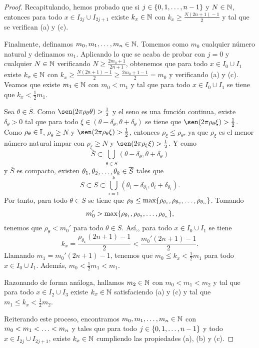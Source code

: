 \documentclass[a4paper, 12pt, oneside]{book}
\begin{document}
\begin{proof}
    Recapitulando, hemos probado que si $j \in \{0,1,\mathellipsis,n-1\}$ y $N \in \mathbb N$, entonces para todo $x \in I_{2j}\cup I_{2j+1}$ existe $k_x \in \mathbb N$ con $k_x \geq \frac{N(2n+1)-1}{2}$ y tal que se verifican (a) y (c).
    
    Finalmente, definamos $m_0,m_1,\mathellipsis,m_n\in \mathbb N$. Tomemos como $m_0$ cualquier número natural y definamos $m_1$. Aplicando lo que se acaba de probar con $j = 0$ y cualquier $N \in \mathbb N$ verificando $N \geq \frac{2m_0+1}{2n+1}$, obtenemos que para todo $x \in I_0 \cup I_1$ existe $k_x \in \mathbb N$ con $k_x \geq \frac{N(2n+1)-1}{2} \geq \frac{2m_0+1-1}{2}= m_0$ y verificando (a) y (c). Veamos que existe $m_1 \in \mathbb N$ con $m_0 < m_1$ y tal que para todo $x \in I_0\cup I_1$ se tiene que $k_x < \frac{1}{2} m_1$.

    Sea $\theta \in \overline{S}$. Como $\sen(2\pi\rho_\theta\theta) > \frac{1}{2}$ y el seno es una función continua, existe $\delta_\theta > 0$ tal que para todo ${\xi} \in (\theta-\delta_\theta,\theta+\delta_\theta)$ se tiene que $\sen(2\pi\rho_{\theta}{\xi}) > \frac{1}{2}$. Como $\rho_\theta \in \mathbb I$, $\rho_\theta \geq N$ y $\sen(2\pi\rho_\theta\xi)> \frac{1}{2}$, entonces $\rho_\xi \leq \rho_\theta$, ya que $\rho_\xi$ es el menor número natural impar con $\rho_\xi \geq N$ y $\sen(2\pi \rho_\xi\xi) > \frac{1}{2}$. Y como
    \[\overline{S} \subset \bigcup_{\theta \in \overline{S}}(\theta - \delta_\theta, \theta + \delta_\theta)\]
    y $\overline{S}$ es compacto, existen $\theta_1,\theta_2,\mathellipsis,\theta_k \in \overline{S}$ tales que
    \[S \subset \overline{S} \subset \bigcup_{i=1}^k (\theta_i-\delta_{\theta_i},\theta_i+\delta_{\theta_i}).\]
    Por tanto, para todo $\theta \in S$ se tiene que $\rho_\theta \leq \max\{\rho_{\theta_1},\rho_{\theta_2},\mathellipsis,\rho_{\theta_n}\}$. Tomando
    \[m_0' > \max \{\rho_{\theta_1},\rho_{\theta_2},\mathellipsis,\rho_{\theta_n}\},\]
    tenemos que $\rho_\theta < m_0'$ para todo $\theta \in S$. Así,, para todo $x \in I_0 \cup I_1$ se tiene
    \[k_x = \frac{\rho_{\theta_x}(2n+1)-1}{2} < \frac{m_0'(2n+1)-1}{2}.\]
    Llamando $m_1 = m_0'(2n+1)-1$, tenemos que $m_0 \leq k_x < \frac{1}{2}m_1$ para todo $x \in I_0 \cup I_1$. Además, $m_0 < \frac{1}{2}m_1 < m_1$.

    Razonando de forma análoga, hallamos $m_2 \in \mathbb N$ con $m_0 < m_1 < m_2$ y tal que para todo $x \in I_{2} \cup I_3$ existe $k_x \in \mathbb N$ satisfaciendo (a) y (c) y tal que $m_1 \leq k_x < \frac{1}{2}m_2$. 
    
    Reiterando este proceso, encontramos $m_0,m_1,\mathellipsis,m_n\in\mathbb N$ con $m_0 < m_1 < \mathellipsis < m_n$ y tales que para todo $j \in \{0,1,\mathellipsis,n-1\}$ y todo $x \in I_{2j}\cup I_{2j+1}$, existe $k_x \in \mathbb N$ cumpliendo las propiedades (a), (b) y (c).
\end{proof}
\end{document}
